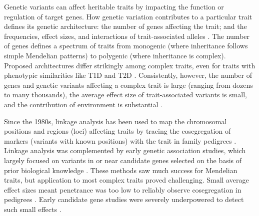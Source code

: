 Genetic variants can affect heritable traits by impacting the function or regulation of target genes.
How genetic variation contributes to a particular trait defines its genetic architecture: the number of genes affecting the trait; and the frequencies, effect sizes, and interactions of trait-associated alleles \autocite{timpson2018GeneticArchitectureShape,visscher2019Fisher1918Paper}.
The number of genes defines a spectrum of traits from monogenic (where inheritance follows simple Mendelian patterns) to polygenic (where inheritance is complex).
Proposed architectures differ strikingly among complex traits, 
even for traits with phenotypic similarities like \gls{T1D} and \gls{T2D} \autocite{timpson2018GeneticArchitectureShape}.
Consistently, however, the number of genes and genetic variants affecting a complex trait is large (ranging from dozens to many thousands),
the average effect size of trait-associated variants is small, 
and the contribution of environment is substantial \autocite{hindorff2009PotentialEtiologicFunctional,gibson2011RareCommonVariants,boyle2017ExpandedViewComplex}.

Since the 1980s, linkage analysis has been used to map the chromosomal positions and regions (loci) affecting traits by tracing the cosegregation of markers (variants with known positions) with the trait in family pedigrees \autocite{altshuler2008GeneticMappingHuman,ott2011FamilybasedDesignsGenomewide,visscher2012FiveYearsGWAS}.
Linkage analysis was complemented by early genetic association studies, which largely focused on variants in or near candidate genes selected on the basis of prior biological knowledge \autocite{hirschhorn2002ComprehensiveReviewGenetic}.
These methods saw much success for Mendelian traits, but application to most complex traits proved challenging.
Small average effect sizes meant penetrance was too low to reliably observe cosegregation in pedigrees \autocite{visscher2012FiveYearsGWAS}.
Early candidate gene studies were severely underpowered to detect such small effects \autocite{border2019NoSupportHistorical}.


